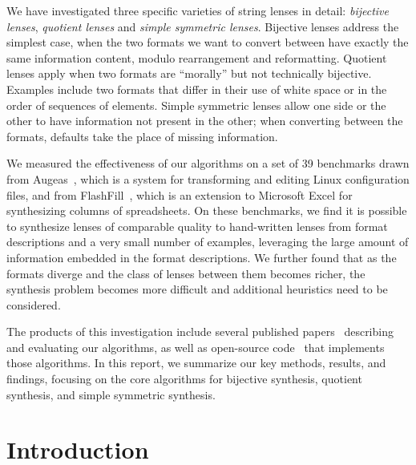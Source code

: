 \documentclass[12pt]{article}
\begin{document}
We have investigated three specific varieties of string lenses in detail: {\em
  bijective lenses}, {\em quotient
lenses} and {\em simple symmetric lenses}.  Bijective lenses address the
simplest case, when the two formats we want to convert between have exactly
the same information content, modulo rearrangement and reformatting.  
Quotient lenses apply when two
formats are ``morally'' but not technically bijective.  Examples include two
formats that differ in their use of white space or in the order of
sequences of elements.  Simple symmetric lenses allow one side or the other
to have 
information not present in the other; when converting between the
formats, defaults take the place of missing information. 

We measured the effectiveness of our
algorithms on a set of 39 benchmarks drawn from Augeas~\cite{augeas},
which is a system for transforming and editing Linux configuration
files, and from FlashFill~\cite{flashfill}, which is an extension to
Microsoft Excel for synthesizing columns of spreadsheets.
On these benchmarks, we find it is possible to synthesize lenses of
comparable quality to hand-written lenses from format descriptions and
a very small number of examples, leveraging 
the large amount of information embedded in the format descriptions. 
We further found that as the formats diverge and the class of lenses
between them becomes richer, the synthesis problem becomes more
difficult and additional heuristics need to be considered.

The products of this investigation include several published
papers~\cite{bijective-synthesis, quotient-synthesis, symmetric-synthesis}
describing and evaluating our algorithms, as well as open-source 
code~\cite{GitHub} that implements those algorithms.  In this report,
we summarize our key methods, results, and findings, focusing
on the core algorithms for bijective synthesis, quotient synthesis, and
simple symmetric synthesis.



\section{Introduction}
\end{document}
